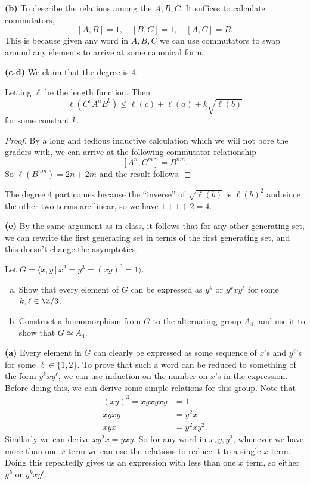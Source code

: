 \documentclass[11pt,letterpaper]{article}
\begin{document}
\textbf{(b)} To describe the relations among the $A,B,C$. It suffices to calculate commutators,
\[
    [A,B]=1, \quad [B,C]=1, \quad [A,C]=B
.\] 
This is because given any word in $A,B,C$ we can use commutators to swap around any elements to arrive at some canonical form.

\textbf{(c-d)} We claim that the degree is $4$.

\begin{lemma}
    Letting $\ell$ be the length function. Then
    \[
        \ell(C^cA^aB^b)\leq \ell(c)+\ell(a)+k\sqrt{\ell(b)}
    \]
    for some constant $k$.
\end{lemma}
\begin{proof}
    By a long and tedious inductive calculation which we will not bore the graders with, we can arrive at the following commutator relationship
    \[
        [A^n, C^m] = B^{nm}
    .\]
    So $\ell(B^{nm})=2n+2m$ and the result follows.
\end{proof}

The degree $4$ part comes because the ``inverse'' of $\sqrt{\ell(b)}$ is $\ell(b)^2$ and since the other two terms are linear, so we have $1+1+2=4$.

\textbf{(e)} By the same argument as in class, it follows that for any other generating set, we can rewrite the first generating set in terms of the first generating set, and this doesn't change the asymptotics.

\pagebreak
\begin{problem}
Let $G=\langle x,y\,|\,x^2=y^3=(xy)^3=1\rangle$.
\begin{enumerate}[(a)]
    \item Show that every element of $G$ can be expressed as $y^k$ or $y^kxy^\ell$ for some $k,\ell\in \Z/3$.
    \item Construct a homomorphism from $G$ to the alternating group $A_4$, and use it to show that $G\simeq A_4$.
\end{enumerate}
\end{problem}

\textbf{(a)} Every element in $G$ can clearly be expressed as some sequence of $x$'s and $y^\ell$'s for some $\ell \in \{1,2\}$. To prove that such a word can be reduced to something of the form $y^kxy^\ell$, we can use induction on the number on $x$'s in the expression. Before doing this, we can derive some simple relations for this group. Note that 
\[
    \begin{aligned}
        (xy)^3=xyxyxy&=1\\
        xyxy&=y^2x\\
        xyx&=y^2xy^2.
    \end{aligned}
\]
Similarly we can derive $xy^2x=yxy$. So for any word in $x,y,y^2$, whenever we have more than one $x$ term we can use the relations to reduce it to a single $x$ term. Doing this repeatedly gives us an expression with less than one $x$ term, so either $y^k$ or $y^kxy^\ell$.
\end{document}
